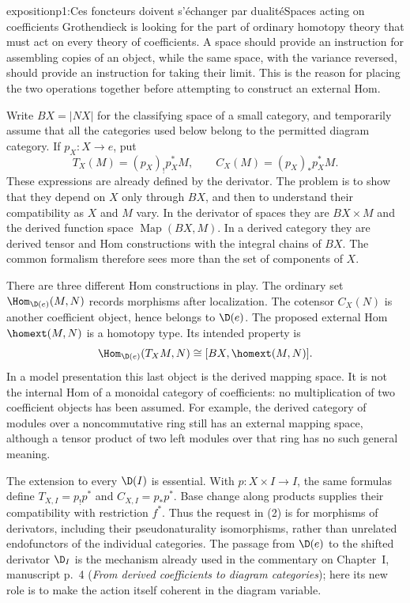 
\begin{dcomment}{exposition}{p1:Ces foncteurs doivent s'échanger par dualité}{Spaces acting on coefficients}
Grothendieck is looking for the part of ordinary homotopy theory that must act on every theory of coefficients. A space should provide an instruction for assembling copies of an object, while the same space, with the variance reversed, should provide an instruction for taking their limit. This is the reason for placing the two operations together before attempting to construct an external Hom.

Write \(B X=|N X|\) for the classifying space of a small category, and temporarily assume that all the categories used below belong to the permitted diagram category. If \(p_X:X\to e\), put
\[
 T_X(M)=(p_X)_!p_X^*M,\qquad
 C_X(M)=(p_X)_*p_X^*M.
\]
These expressions are already defined by the derivator. The problem is to show that they depend on \(X\) only through \(B X\), and then to understand their compatibility as \(X\) and \(M\) vary. In the derivator of spaces they are \(B X\times M\) and the derived function space \(\operatorname{Map}(B X,M)\). In a derived category they are derived tensor and Hom constructions with the integral chains of \(B X\). The common formalism therefore sees more than the set of components of \(X\).

There are three different Hom constructions in play. The ordinary set \(\Hom_{\D(e)}(M,N)\) records morphisms after localization. The cotensor \(C_X(N)\) is another coefficient object, hence belongs to \(\D(e)\). The proposed external Hom \(\homext(M,N)\) is a homotopy type. Its intended property is
\[
 \Hom_{\D(e)}(T_XM,N)
 \cong [B X,\homext(M,N)].
\]
In a model presentation this last object is the derived mapping space. It is not the internal Hom of a monoidal category of coefficients: no multiplication of two coefficient objects has been assumed. For example, the derived category of modules over a noncommutative ring still has an external mapping space, although a tensor product of two left modules over that ring has no such general meaning.

The extension to every \(\D(I)\) is essential. With \(p:X\times I\to I\), the same formulas define \(T_{X,I}=p_!p^*\) and \(C_{X,I}=p_*p^*\). Base change along products supplies their compatibility with restriction \(f^*\). Thus the request in (2) is for morphisms of derivators, including their pseudonaturality isomorphisms, rather than unrelated endofunctors of the individual categories. The passage from \(\D(e)\) to the shifted derivator \(\D_I\) is the mechanism already used in the commentary on Chapter~I, manuscript p.~4 (\emph{From derived coefficients to diagram categories}); here its new role is to make the action itself coherent in the diagram variable.


\end{dcomment}
